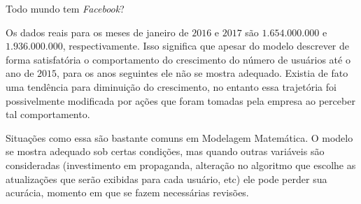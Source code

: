 \begin{task}{ Todo mundo tem \emph{Facebook}?}
\begin{enumerate}
\end{enumerate}

Os dados reais para os meses de janeiro de \(2016\) e \(2017\) são \(1.654.000.000\) e \(1.936.000.000\), respectivamente. Isso significa que apesar do modelo descrever de forma satisfatória o comportamento do crescimento do número de usuários até o ano de \(2015\), para os anos seguintes ele não se mostra adequado. Existia de fato uma tendência para diminuição do crescimento, no entanto essa trajetória foi possivelmente modificada por ações que foram tomadas pela empresa ao perceber tal comportamento.

Situações como essa são bastante comuns em Modelagem Matemática. O modelo se mostra adequado sob certas condições, mas quando outras variáveis são consideradas (investimento em propaganda, alteração no algoritmo que escolhe as atualizações que serão exibidas para cada usuário, etc) ele pode perder sua acurácia, momento em que se fazem necessárias revisões.

\end{task}

